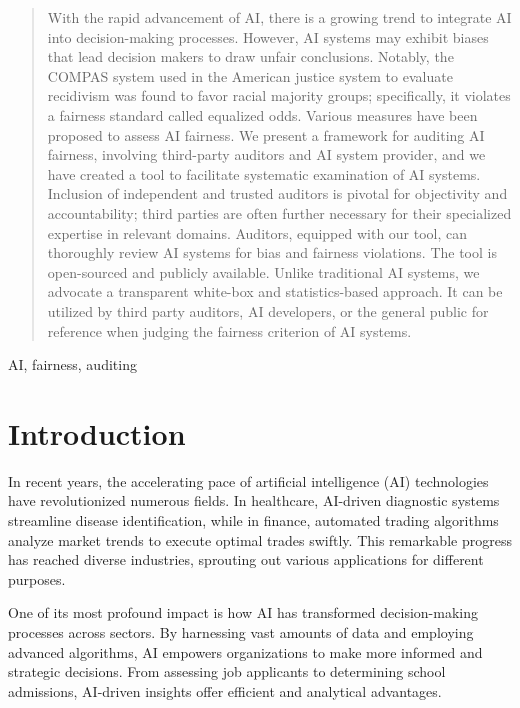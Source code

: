 \documentclass[conference]{IEEEtran}
\begin{document}
\begin{abstract}
With the rapid advancement of AI, there is a growing trend to integrate AI into decision-making processes. However, AI systems may exhibit biases that lead decision makers to draw unfair conclusions. Notably, the COMPAS system used in the American justice system to evaluate recidivism was found to favor racial majority groups; specifically, it violates a fairness standard called equalized odds. Various measures have been proposed to assess AI fairness. We present a framework for auditing AI fairness, involving third-party auditors and AI system provider, and we have created a tool to facilitate systematic examination of AI systems. Inclusion of independent and trusted auditors is pivotal for objectivity and accountability; third parties are often further necessary for their specialized expertise in relevant domains. Auditors, equipped with our tool, can thoroughly review AI systems for bias and fairness violations. The tool is open-sourced and publicly available. Unlike traditional AI systems, we advocate a transparent white-box and statistics-based approach. It can be utilized by third party auditors, AI developers, or the general public for reference when judging the fairness criterion of AI systems.
\end{abstract}

\begin{IEEEkeywords}
AI, fairness, auditing
\end{IEEEkeywords}

\section{Introduction}
In recent years, the accelerating pace of artificial intelligence (AI) technologies have revolutionized numerous fields. In healthcare, AI-driven diagnostic systems streamline disease identification, while in finance, automated trading algorithms analyze market trends to execute optimal trades swiftly. This remarkable progress has reached diverse industries, sprouting out various applications for different purposes.

One of its most profound impact is how AI has transformed decision-making processes across sectors. By harnessing vast amounts of data and employing advanced algorithms, AI empowers organizations to make more informed and strategic decisions. From assessing job applicants to determining school admissions, AI-driven insights offer efficient and analytical advantages.
\end{document}
